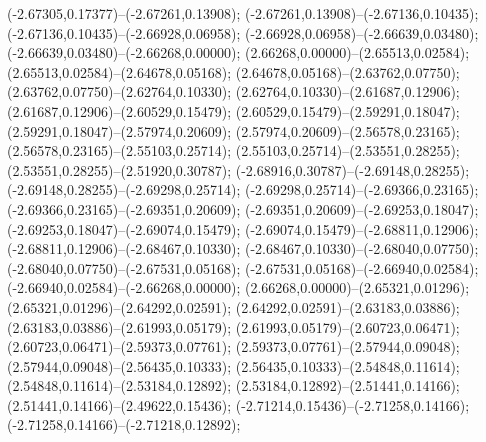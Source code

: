  (-2.67305,0.17377)--(-2.67261,0.13908);
 (-2.67261,0.13908)--(-2.67136,0.10435);
 (-2.67136,0.10435)--(-2.66928,0.06958);
 (-2.66928,0.06958)--(-2.66639,0.03480);
 (-2.66639,0.03480)--(-2.66268,0.00000);
 (2.66268,0.00000)--(2.65513,0.02584);
 (2.65513,0.02584)--(2.64678,0.05168);
 (2.64678,0.05168)--(2.63762,0.07750);
 (2.63762,0.07750)--(2.62764,0.10330);
 (2.62764,0.10330)--(2.61687,0.12906);
 (2.61687,0.12906)--(2.60529,0.15479);
 (2.60529,0.15479)--(2.59291,0.18047);
 (2.59291,0.18047)--(2.57974,0.20609);
 (2.57974,0.20609)--(2.56578,0.23165);
 (2.56578,0.23165)--(2.55103,0.25714);
 (2.55103,0.25714)--(2.53551,0.28255);
 (2.53551,0.28255)--(2.51920,0.30787);
 (-2.68916,0.30787)--(-2.69148,0.28255);
 (-2.69148,0.28255)--(-2.69298,0.25714);
 (-2.69298,0.25714)--(-2.69366,0.23165);
 (-2.69366,0.23165)--(-2.69351,0.20609);
 (-2.69351,0.20609)--(-2.69253,0.18047);
 (-2.69253,0.18047)--(-2.69074,0.15479);
 (-2.69074,0.15479)--(-2.68811,0.12906);
 (-2.68811,0.12906)--(-2.68467,0.10330);
 (-2.68467,0.10330)--(-2.68040,0.07750);
 (-2.68040,0.07750)--(-2.67531,0.05168);
 (-2.67531,0.05168)--(-2.66940,0.02584);
 (-2.66940,0.02584)--(-2.66268,0.00000);
 (2.66268,0.00000)--(2.65321,0.01296);
 (2.65321,0.01296)--(2.64292,0.02591);
 (2.64292,0.02591)--(2.63183,0.03886);
 (2.63183,0.03886)--(2.61993,0.05179);
 (2.61993,0.05179)--(2.60723,0.06471);
 (2.60723,0.06471)--(2.59373,0.07761);
 (2.59373,0.07761)--(2.57944,0.09048);
 (2.57944,0.09048)--(2.56435,0.10333);
 (2.56435,0.10333)--(2.54848,0.11614);
 (2.54848,0.11614)--(2.53184,0.12892);
 (2.53184,0.12892)--(2.51441,0.14166);
 (2.51441,0.14166)--(2.49622,0.15436);
 (-2.71214,0.15436)--(-2.71258,0.14166);
 (-2.71258,0.14166)--(-2.71218,0.12892);
